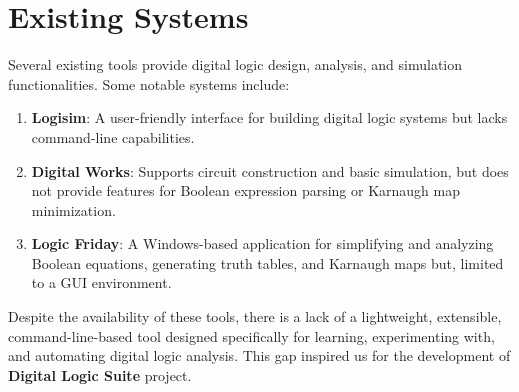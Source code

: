 \section{Existing Systems}
Several existing tools provide digital logic design, analysis, and simulation functionalities. Some notable systems include:
\renewcommand{\labelenumi}{\roman{enumi}.}
\begin{enumerate}
    \item \textbf{Logisim}: A user-friendly interface for building digital logic systems but lacks command-line capabilities.

    \item \textbf{Digital Works}: Supports circuit construction and basic simulation, but does not provide features for Boolean expression parsing or Karnaugh map minimization.

    \item \textbf{Logic Friday}: A Windows-based application for simplifying and analyzing Boolean equations, generating truth tables, and Karnaugh maps but, limited to a GUI environment.
\end{enumerate}

Despite the availability of these tools, there is a lack of a lightweight, extensible, command-line-based tool designed specifically for learning, experimenting with, and automating digital logic analysis. This gap inspired us for the development of \textbf{Digital Logic Suite} project.


